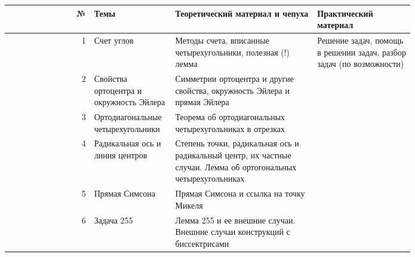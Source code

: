 \begin{table}[ht]
    \centering
    \begin{tabular}{|r|p{0.2\linewidth}|p{0.35\linewidth}|p{0.24\linewidth}|}
        \hline
        
        \textbf{№} & \textbf{Темы} & \textbf{Теоретический материал и чепуха} & \textbf{Практический материал} \\
        
        \hline
        
        1 & Счет углов & Методы счета, вписанные четырехугольники, полезная (!) лемма & \multirow{6}{4.2cm}{Решение задач, помощь в решении задач, разбор задач (по возможности)} \\ \cline{1-3}
        2 & Свойства ортоцентра и окружность Эйлера & Симметрии ортоцентра и другие свойства, окружность Эйлера и прямая Эйлера  & \\ \cline{1-3}
        3 & О\-рто\-ди\-а\-го\-на\-ль\-ны\-е четырехугольники & Теорема об ортодиагональных четырехугольниках в отрезках &  \\ \cline{1-3}
        4 & Радикальная ось и линия центров & Степень точки, радикальная ось и радикальный центр, их частные случаи. Лемма об ортогональных четырехугольниках &  \\ \cline{1-3}
        5 & Прямая Симсона & Прямая Симсона и ссылка на точку Микеля &  \\ \cline{1-3}
        6 & Задача 255 & Лемма 255 и ее внешние случаи. Внешние случаи конструкций с биссектрисами &  \\ \hline
    \end{tabular}
\end{table}